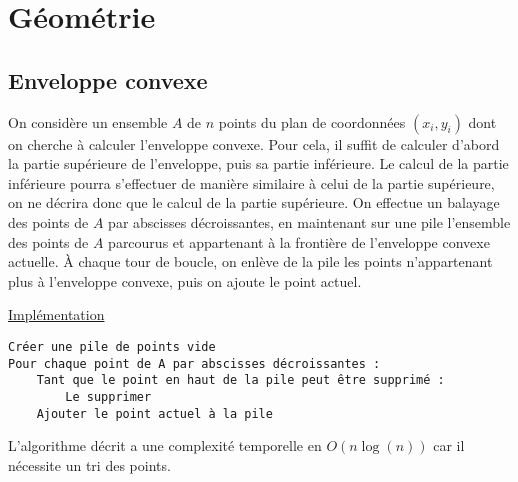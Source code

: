 \documentclass[11pt,a4paper]{article}
\begin{document}
  \section{Géométrie}

    \subsection{Enveloppe convexe}

On considère un ensemble \(A\) de \(n\) points du plan de coordonnées \((x_i,y_i)\) dont on cherche à calculer l'enveloppe convexe. Pour cela, il suffit de calculer d'abord la partie supérieure de l'enveloppe, puis sa partie inférieure. Le calcul de la partie inférieure pourra s'effectuer de manière similaire à celui de la partie supérieure, on ne décrira donc que le calcul de la partie supérieure. On effectue un balayage des points de \(A\) par abscisses décroissantes, en maintenant sur une pile l'ensemble des points de \(A\) parcourus et appartenant à la frontière de l'enveloppe convexe actuelle. À chaque tour de boucle, on enlève de la pile les points n'appartenant plus à l'enveloppe convexe, puis on ajoute le point actuel.

\noindent\href{https://github.com/AdrienVannson/algo-lib/blob/master/include/geometry/convex-hull.hpp}{Implémentation}
\begin{lstlisting}
Créer une pile de points vide
Pour chaque point de A par abscisses décroissantes :
    Tant que le point en haut de la pile peut être supprimé :
        Le supprimer
    Ajouter le point actuel à la pile
\end{lstlisting}

L'algorithme décrit a une complexité temporelle en \(O(n \log(n) )\) car il nécessite un tri des points.
\end{document}
